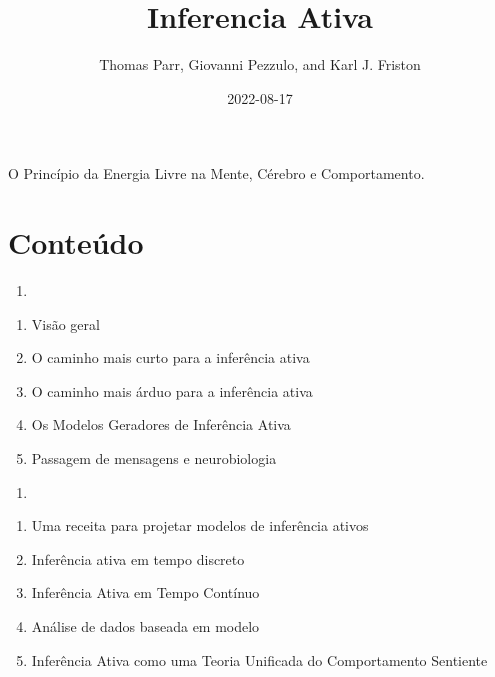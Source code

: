 \documentclass[
  12pt,
]{book}
\title{Inferencia Ativa}
\author{Thomas Parr, Giovanni Pezzulo, and Karl J. Friston}
\date{2022-08-17}
\providecommand{\tightlist}{%
  \setlength{\itemsep}{0pt}\setlength{\parskip}{0pt}}
\begin{document}
\maketitle

{
\hypersetup{linkcolor=}
\setcounter{tocdepth}{1}
\tableofcontents
}
\listoffigures
\listoftables
O Princípio da Energia Livre na Mente, Cérebro e Comportamento.

\hypertarget{conteuxfado}{%
\chapter*{Conteúdo}\label{conteuxfado}}

\begin{enumerate}
\def\labelenumi{(\Roman{enumi})}
\tightlist
\item
\end{enumerate}

\begin{enumerate}
\def\labelenumi{\arabic{enumi}.}
\tightlist
\item
  Visão geral\\
\item
  O caminho mais curto para a inferência ativa\\
\item
  O caminho mais árduo para a inferência ativa\\
\item
  Os Modelos Geradores de Inferência Ativa\\
\item
  Passagem de mensagens e neurobiologia
\end{enumerate}

\begin{enumerate}
\def\labelenumi{(\Roman{enumi})}
\setcounter{enumi}{1}
\tightlist
\item
\end{enumerate}

\begin{enumerate}
\def\labelenumi{\arabic{enumi}.}
\setcounter{enumi}{5}
\tightlist
\item
  Uma receita para projetar modelos de inferência ativos
\item
  Inferência ativa em tempo discreto
\item
  Inferência Ativa em Tempo Contínuo
\item
  Análise de dados baseada em modelo
\item
  Inferência Ativa como uma Teoria Unificada do Comportamento Sentiente
\end{enumerate}
\end{document}
